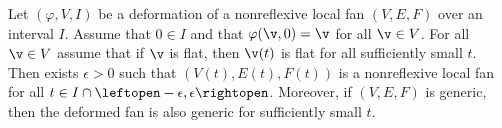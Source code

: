 \begin{lemma}[]\label{lemma:fan-open}
  Let $(\varphi,V,I)$ be a deformation of a nonreflexive local fan
  $(V,E,F)$ over an interval $I$.  Assume that $0\in I$ and that
  $\varphi(\v,0)=\v$ for all $\v\in V$.  For all $\v\in V$ assume that
  if $\v$ is flat, then  $\v(t)$ is flat 
  for all sufficiently small  $t$.
Then exists $\epsilon>0$ such that $(V(t),E(t),F(t))$ is a nonreflexive local fan
for all $t\in I\cap \leftopen -\epsilon,\epsilon\rightopen$.  
Moreover,  if $(V,E,F)$ is
generic, then the deformed fan is also generic for sufficiently small 
$t$.
\end{lemma}

